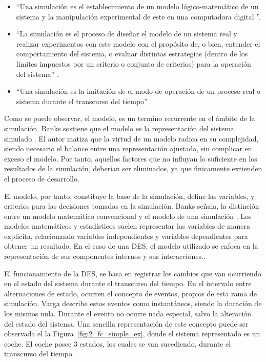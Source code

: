 \begin{itemize}
	\item ``Una simulación es
	el establecimiento de un modelo lógico-matemático de un sistema
	y la manipulación experimental de este en una computadora digital
	\citep{pritsker1974gasp}''.   
	\item ``La simulación es el proceso de diseñar
		el modelo de un sistema real y realizar experimentos
		con este modelo con el propósito de,
		o bien,
		entender el comportamiento del sistema,
		o evaluar distintas estrategias
		(dentro de los limites impuestos por un criterio
		o conjunto de criterios)
		para la operación del sistema'' \citep{shannon1976systems}.
	\item ``Una simulación es la imitación de el modo de operación
		de un proceso real o sistema durante el transcurso del tiempo''
		\citep{banks1999introduction}.
\end{itemize}

Como se puede observar, el modelo,
es un termino recurrente en el ámbito de la simulación.
Banks sostiene que el modelo es la representación del sistema simulado
\citep{banks1998handbook}.
El autor matiza que la virtud de un modelo radica en su complejidad,
siendo necesario el balance entre una representación ajustada,
sin complicar en exceso el modelo.
Por tanto, aquellos factores que no influyan lo suficiente
en los resultados de la simulación, deberían ser eliminados,
ya que únicamente extienden el proceso de desarrollo.

El modelo, por tanto, constituye la base de la simulación,
define las variables, y criterios para las decisiones tomadas en la simulación.
Banks señala, la distinción entre un modelo matemático convencional
y el modelo de una simulación \citep{banks1998handbook}.
Los modelos matemáticos y estadísticos
suelen representar las variables de manera explicita,
relacionando variables independientes y variables dependientes
para obtener un resultado.
En el caso de una DES, el modelo utilizado se enfoca en
la representación de sus componentes internos y sus interacciones..

El funcionamiento de la DES, se basa en registrar los cambios
que van ocurriendo en el estado del sistema durante el transcurso del tiempo.
En el intervalo entre alternaciones de estado,
ocurren el concepto de eventos, propios de esta rama de simulación.
Varga \citep{varga2001discrete} describe estos eventos como instantáneos,
siendo la duración de los mismos nula.
Durante el evento no ocurre nada especial,
salvo la alteración del estado del sistema.
Una sencilla representación de este concepto
puede ser observada el la Figura~\ref{fig:2_fc_simple_ex},
donde el sistema representado es un coche.
El coche posee 3 estados, los cuales se van sucediendo,
durante el transcurso del tiempo.

